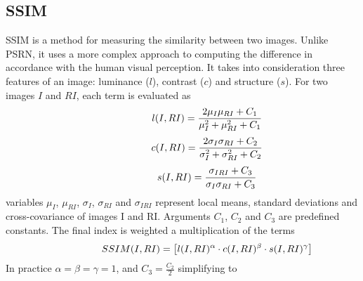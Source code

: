 \subsection{SSIM}
SSIM is a method for measuring the similarity between two images. Unlike PSRN, it uses a more complex approach to computing the difference in accordance with the human visual perception. It takes into consideration three features of an image: luminance ($l$), contrast ($c$) and structure ($s$). For two images $I$ and $RI$, each term is evaluated as
\begin{equation} \label{eq:Lumi}
\centering
\hspace{3em} \hspace{3em} \hspace{3em} l(I,RI)= \frac{2\mu_{I} \mu_{RI} + C_1}{\mu_{I}^2 + \mu_{RI}^2 + C_1} \enspace \enspace \hspace{3em}
\end{equation}
\begin{equation} \label{eq:contra}
\centering
\hspace{3em} \hspace{3em} \hspace{3em} c(I,RI)= \frac{2\sigma_{I} \sigma_{RI} + C_2}{\sigma_{I}^2 + \sigma_{RI}^2 + C_2} \enspace \enspace \hspace{3em}
\end{equation}
\begin{equation} \label{eq:Struct}
\centering
\hspace{3em} \hspace{3em} \hspace{3em} s(I,RI)= \frac{\sigma_{IRI} + C_3}{\sigma_{I} \sigma_{RI} + C_3} \enspace \enspace \hspace{3em}
\end{equation}
variables $\mu_{I}$, $\mu_{RI}$, $\sigma_{I}$, $\sigma_{RI}$ and $\sigma_{IRI}$ represent local means, standard deviations and cross-covariance of images I and RI. Arguments $C_1$, $C_2$ and $C_3$ are predefined constants. The final index is weighted a multiplication of the terms
\begin{equation} \label{eq:ssim1}
\centering
\hspace{3em} \hspace{3em} \hspace{3em} SSIM(I,RI)= \big[ l(I,RI)^{\alpha} \cdot c(I,RI)^{\beta} \cdot s(I,RI)^{\gamma} \big]   \enspace \enspace \hspace{3em}
\end{equation}
In practice $\alpha = \beta = \gamma = 1$, and $C_3 = \frac{C_2}{2}$ simplifying to
